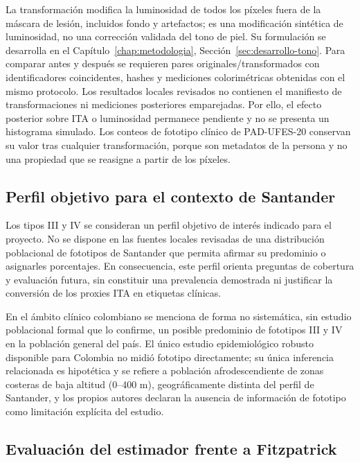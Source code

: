La transformación modifica la luminosidad de todos los píxeles fuera de la máscara de lesión, incluidos fondo y artefactos; es una modificación sintética de luminosidad, no una corrección validada del tono de piel. Su formulación se desarrolla en el Capítulo~\ref{chap:metodologia}, Sección~\ref{sec:desarrollo-tono}. Para comparar antes y después se requieren pares originales/transformados con identificadores coincidentes, hashes y mediciones colorimétricas obtenidas con el mismo protocolo. Los resultados locales revisados no contienen el manifiesto de transformaciones ni mediciones posteriores emparejadas. Por ello, el efecto posterior sobre ITA o luminosidad permanece pendiente y no se presenta un histograma simulado. Los conteos de fototipo clínico de PAD-UFES-20 conservan su valor tras cualquier transformación, porque son metadatos de la persona y no una propiedad que se reasigne a partir de los píxeles.

\subsection{Perfil objetivo para el contexto de Santander}

Los tipos III y IV se consideran un perfil objetivo de interés indicado para el proyecto. No se dispone en las fuentes locales revisadas de una distribución poblacional de fototipos de Santander que permita afirmar su predominio o asignarles porcentajes. En consecuencia, este perfil orienta preguntas de cobertura y evaluación futura, sin constituir una prevalencia demostrada ni justificar la conversión de los proxies ITA en etiquetas clínicas.

En el ámbito clínico colombiano se menciona de forma no sistemática, sin estudio poblacional formal que lo confirme, un posible predominio de fototipos III y IV en la población general del país. El único estudio epidemiológico robusto disponible para Colombia \parencite{oliveros2025melanomacolombia} no midió fototipo directamente; su única inferencia relacionada es hipotética y se refiere a población afrodescendiente de zonas costeras de baja altitud (0--400 m), geográficamente distinta del perfil de Santander, y los propios autores declaran la ausencia de información de fototipo como limitación explícita del estudio.

\subsection{Evaluación del estimador frente a Fitzpatrick}


